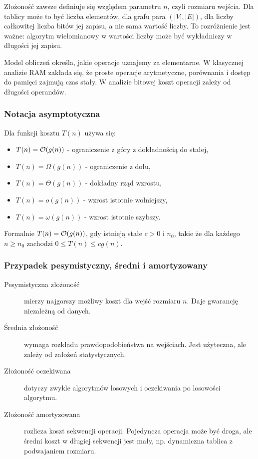 Złożoność zawsze definiuje się względem parametru $n$, czyli rozmiaru wejścia. Dla tablicy może to być liczba elementów, dla grafu para $(|V|,|E|)$, dla liczby całkowitej liczba bitów jej zapisu, a nie sama wartość liczby. To rozróżnienie jest ważne: algorytm wielomianowy w wartości liczby może być wykładniczy w długości jej zapisu.

Model obliczeń określa, jakie operacje uznajemy za elementarne. W klasycznej analizie RAM zakłada się, że proste operacje arytmetyczne, porównania i dostęp do pamięci zajmują czas stały. W analizie bitowej koszt operacji zależy od długości operandów.

\subsubsection{Notacja asymptotyczna}

Dla funkcji kosztu $T(n)$ używa się:
\begin{itemize}
  \item $T(n)=\mathcal{O}(g(n))$ - ograniczenie z góry z dokładnością do stałej,
  \item $T(n)=\Omega(g(n))$ - ograniczenie z dołu,
  \item $T(n)=\Theta(g(n))$ - dokładny rząd wzrostu,
  \item $T(n)=o(g(n))$ - wzrost istotnie wolniejszy,
  \item $T(n)=\omega(g(n))$ - wzrost istotnie szybszy.
\end{itemize}

Formalnie $T(n)=\mathcal{O}(g(n))$, gdy istnieją stałe $c>0$ i $n_0$, takie że dla każdego $n\ge n_0$ zachodzi $0\le T(n)\le c g(n)$.

\subsubsection{Przypadek pesymistyczny, średni i amortyzowany}

\begin{description}
  \item[Pesymistyczna złożoność] mierzy najgorszy możliwy koszt dla wejść rozmiaru $n$. Daje gwarancję niezależną od danych.
  \item[Średnia złożoność] wymaga rozkładu prawdopodobieństwa na wejściach. Jest użyteczna, ale zależy od założeń statystycznych.
  \item[Złożoność oczekiwana] dotyczy zwykle algorytmów losowych i oczekiwania po losowości algorytmu.
  \item[Złożoność amortyzowana] rozlicza koszt sekwencji operacji. Pojedyncza operacja może być droga, ale średni koszt w długiej sekwencji jest mały, np. dynamiczna tablica z podwajaniem rozmiaru.
\end{description}

